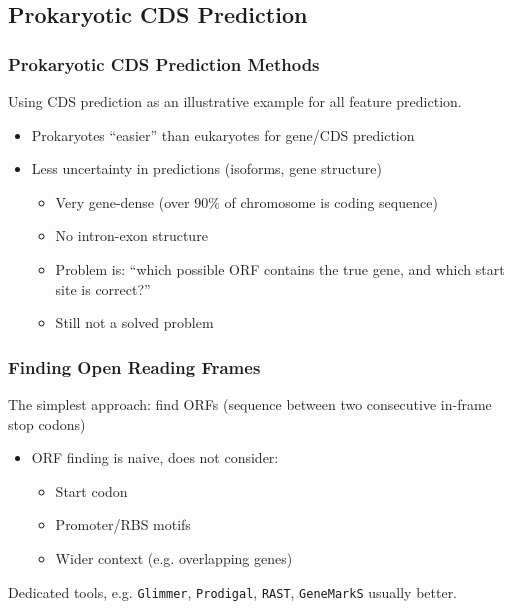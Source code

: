 
\subsection{Prokaryotic CDS Prediction}

\begin{frame}
  \frametitle{Prokaryotic CDS Prediction Methods}
  Using CDS prediction as an illustrative example for all feature prediction.\\[0.2cm]
  \begin{itemize}
    \item Prokaryotes ``easier'' than eukaryotes for gene/CDS prediction
    \item Less uncertainty in predictions (isoforms, gene structure)
    \begin{itemize}
      \item Very gene-dense (over 90\% of chromosome is coding sequence)
      \item No intron-exon structure
      \item Problem is: ``which possible ORF contains the true gene, and which start site is correct?''
      \item Still not a solved problem
    \end{itemize}       
  \end{itemize}
\end{frame}

\begin{frame}
  \frametitle{Finding Open Reading Frames}
  The simplest approach: find ORFs (sequence between two consecutive in-frame stop codons)
  \begin{itemize}
    \item<1-> ORF finding is naive, does not consider:
    \begin{itemize}
      \item Start codon
      \item Promoter/RBS motifs
      \item Wider context (e.g. overlapping genes)
    \end{itemize}
  \end{itemize}
  Dedicated tools, e.g. \texttt{Glimmer}, \texttt{Prodigal}, \texttt{RAST}, \texttt{GeneMarkS} usually better.
\end{frame}

